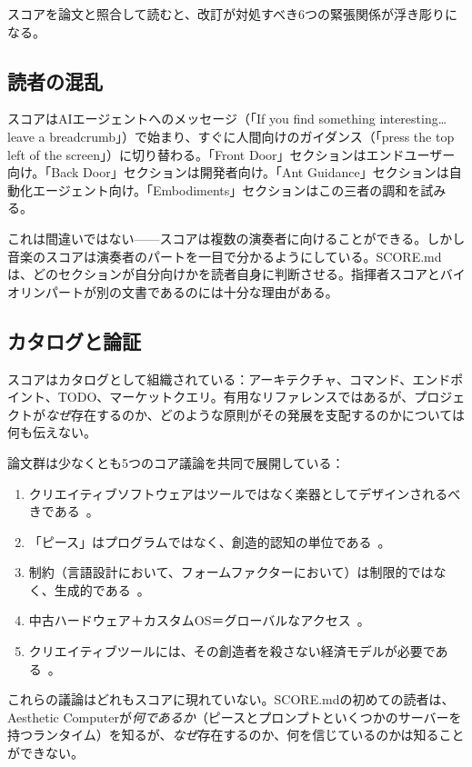\documentclass[10pt,letterpaper,twocolumn]{article}
\begin{document}
スコアを論文と照合して読むと、改訂が対処すべき6つの緊張関係が浮き彫りになる。

\subsection{読者の混乱}

スコアはAIエージェントへのメッセージ（「If you find something interesting\ldots leave a breadcrumb」）で始まり、すぐに人間向けのガイダンス（「press the top left of the screen」）に切り替わる。「Front Door」セクションはエンドユーザー向け。「Back Door」セクションは開発者向け。「Ant Guidance」セクションは自動化エージェント向け。「Embodiments」セクションはこの三者の調和を試みる。

これは間違いではない——スコアは複数の演奏者に向けることができる。しかし音楽のスコアは演奏者のパートを一目で分かるようにしている。SCORE.mdは、どのセクションが自分向けかを読者自身に判断させる。指揮者スコアとバイオリンパートが別の文書であるのには十分な理由がある。

\subsection{カタログと論証}

スコアはカタログとして組織されている：アーキテクチャ、コマンド、エンドポイント、TODO、マーケットクエリ。有用なリファレンスではあるが、プロジェクトが\emph{なぜ}存在するのか、どのような原則がその発展を支配するのかについては何も伝えない。

論文群は少なくとも5つのコア議論を共同で展開している：
\begin{enumerate}
\item クリエイティブソフトウェアはツールではなく楽器としてデザインされるべきである~\citep{scudder2026goodiepal}。
\item 「ピース」はプログラムではなく、創造的認知の単位である~\citep{scudder2026pieces}。
\item 制約（言語設計において、フォームファクターにおいて）は制限的ではなく、生成的である~\citep{scudder2026kidlisp, scudder2026cards}。
\item 中古ハードウェア＋カスタムOS＝グローバルなアクセス~\citep{scudder2026os, scudder2026plork}。
\item クリエイティブツールには、その創造者を殺さない経済モデルが必要である~\citep{scudder2026sustainability}。
\end{enumerate}

これらの議論はどれもスコアに現れていない。SCORE.mdの初めての読者は、Aesthetic Computerが\emph{何であるか}（ピースとプロンプトといくつかのサーバーを持つランタイム）を知るが、\emph{なぜ}存在するのか、何を信じているのかは知ることができない。
\end{document}
